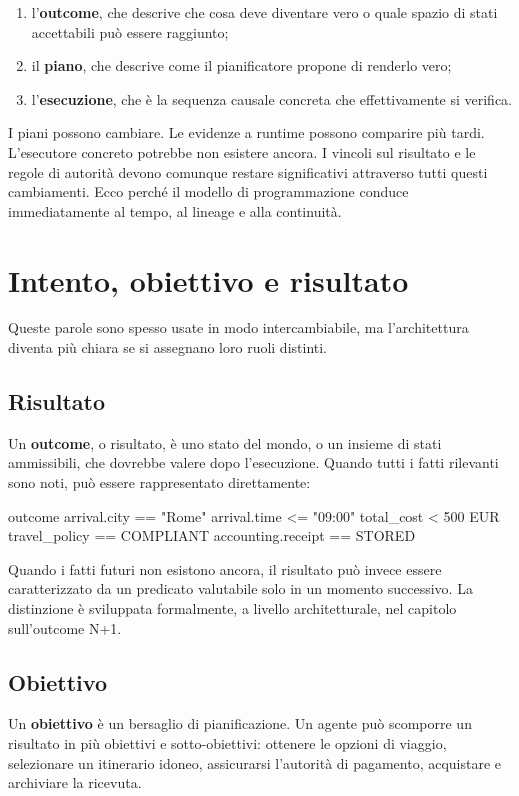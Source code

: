 \documentclass[10pt,oneside,openany]{book}
\newcommand{\term}[1]{\textbf{#1}}
\begin{document}
\begin{enumerate}
\item l'\term{outcome}, che descrive che cosa deve diventare vero o quale spazio di stati accettabili può essere raggiunto;
\item il \term{piano}, che descrive come il pianificatore propone di renderlo vero;
\item l'\term{esecuzione}, che è la sequenza causale concreta che effettivamente si verifica.
\end{enumerate}

I piani possono cambiare. Le evidenze a runtime possono comparire più tardi. L'esecutore concreto potrebbe non esistere ancora. I vincoli sul risultato e le regole di autorità devono comunque restare significativi attraverso tutti questi cambiamenti. Ecco perché il modello di programmazione conduce immediatamente al tempo, al lineage e alla continuità.

\chapter{Intento, obiettivo e risultato}

Queste parole sono spesso usate in modo intercambiabile, ma l'architettura diventa più chiara se si assegnano loro ruoli distinti.

\section{Risultato}
Un \term{outcome}, o risultato, è uno stato del mondo, o un insieme di stati ammissibili, che dovrebbe valere dopo l'esecuzione. Quando tutti i fatti rilevanti sono noti, può essere rappresentato direttamente:

\begin{codeblock}
outcome {
  arrival.city == "Rome"
  arrival.time <= "09:00"
  total_cost < 500 EUR
  travel_policy == COMPLIANT
  accounting.receipt == STORED
}
\end{codeblock}

Quando i fatti futuri non esistono ancora, il risultato può invece essere caratterizzato da un predicato valutabile solo in un momento successivo. La distinzione è sviluppata formalmente, a livello architetturale, nel capitolo sull'outcome N+1.

\section{Obiettivo}
Un \term{obiettivo} è un bersaglio di pianificazione. Un agente può scomporre un risultato in più obiettivi e sotto-obiettivi: ottenere le opzioni di viaggio, selezionare un itinerario idoneo, assicurarsi l'autorità di pagamento, acquistare e archiviare la ricevuta.
\end{document}
